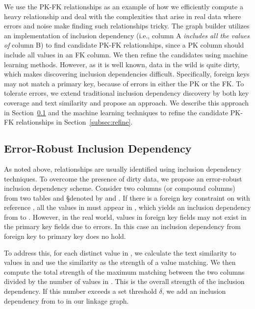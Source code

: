 We use the PK-FK relationships as an example of how we efficiently compute a
heavy relationship and deal with the complexities that arise in real data where
errors and noise make finding such relationships tricky. The graph builder
utilizes an implementation 
of inclusion dependency (i.e., column A {\it includes
all the values of} column B) to find candidate PK-FK relationships, since a PK column
should include all values in an FK column. We then refine the candidates using
machine learning methods. However, as it is well known, data in the wild is
quite dirty, which makes discovering inclusion dependencies difficult.
Specifically, foreign keys may not match a primary key, because of errors in
either the PK or the FK. To tolerate errors, we extend traditional inclusion
dependency discovery by both key coverage and text similarity and propose an
\emph{\eind} approach.  We describe this approach in Section~\ref{subsec:eind}
and the machine learning techniques to refine the candidate PK-FK relationships
in Section~\ref{subsec:refine}.

\subsection{Error-Robust Inclusion Dependency}\label{subsec:eind}

As noted above, \pkfk relationships are usually identified using inclusion
dependency techniques. To overcome the presence of dirty data, we propose an
error-robust inclusion dependency scheme.
Consider two columns (or compound columns) from two tables \R and \S denoted by
\RX and \SY. If there is a foreign key constraint on \RX with reference \SY, all
the values in \RX must appear in \SY, which yields an inclusion dependency from
\RX to \SY. However, in the real world, values in foreign key fields may not
exist in the primary key fields due to errors.  In this case an inclusion
dependency from foreign key to primary key does no hold.

To address this, for each distinct value in \RX, we calculate the
text similarity to values in \SY and use the similarity as the strength of a
value matching. We then compute the total strength of the maximum matching between the two columns
divided by the number of values in \RX. This is the overall strength of the
inclusion dependency.  If this number exceeds a set threshold $\delta$,
we add an inclusion dependency from \RX to \SY in our linkage graph.

